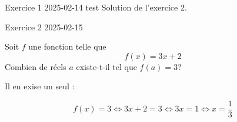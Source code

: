 \documentclass[10pt,a4paper]{letter}
\newenvironment{exercise}{}{}
\renewcommand{\title}[1]{#1}
\renewcommand{\date}[1]{#1}
\newcommand{\content}[1]{#1}
\newcommand{\solution}[1]{#1}
\begin{document}
\begin{exercise}
\title{Exercice 1}
\date{2025-02-14}
\content{test}
\solution{Solution de l'exercice 2.}
\end{exercise}

\begin{exercise}
\title{Exercice 2}
\date{2025-02-15}
\content{
Soit $f$ une fonction telle que 
$$
f(x)=3x+2
$$
Combien de réels $a$ existe-t-il tel que $f(a)=3$?
}
\solution{Il en exise un seul :

$$
f(x)=3\Leftrightarrow 3x+2=3\Leftrightarrow 3x=1\Leftrightarrow x=\frac{1}{3}
$$
}
\end{exercise}
    
\end{document}
